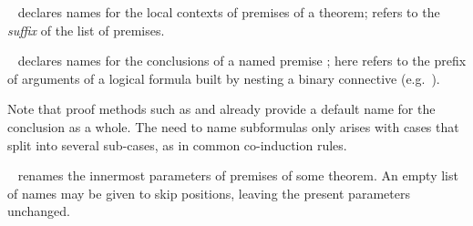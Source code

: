 \begin{isabellebody}
\begin{isamarkuptext}
\begin{description}
  \item \hyperlink{attribute.case-names}{\mbox{}}~ declares names for
  the local contexts of premises of a theorem; 
  refers to the \emph{suffix} of the list of premises.
  
  \item \hyperlink{attribute.case-conclusion}{\mbox{}}~ declares
  names for the conclusions of a named premise ; here  refers to the prefix of arguments of a logical formula
  built by nesting a binary connective (e.g.\ ).
  
  Note that proof methods such as \hyperlink{method.induct}{\mbox{}} and \hyperlink{method.coinduct}{\mbox{}} already provide a default name for the conclusion as a
  whole.  The need to name subformulas only arises with cases that
  split into several sub-cases, as in common co-induction rules.

  \item \hyperlink{attribute.params}{\mbox{}}~ renames
  the innermost parameters of premises  of some
  theorem.  An empty list of names may be given to skip positions,
  leaving the present parameters unchanged.
  

\end{description}
\end{isamarkuptext}
\end{isabellebody}
